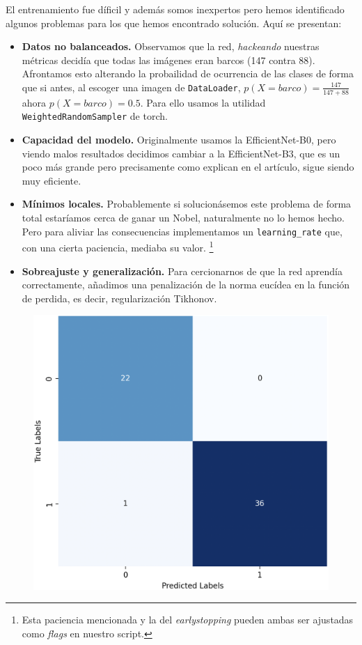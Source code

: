 \documentclass{article}
\begin{document}
El entrenamiento fue díficil y además somos inexpertos pero hemos identificado algunos problemas para los que hemos encontrado solución. Aquí se presentan:
\begin{itemize}
	\item \textbf{Datos no balanceados.} Observamos que la red, \emph{hackeando} nuestras métricas decidía que todas las imágenes eran barcos (147 contra 88). Afrontamos esto alterando la probailidad de ocurrencia de las clases de forma que si antes, al escoger una imagen de \texttt{DataLoader}, $p(X=barco) = \frac{147}{147+88}$ ahora $p(X = barco) = 0.5$. Para ello usamos la utilidad \texttt{WeightedRandomSampler} de torch.
	\item \textbf{Capacidad del modelo.} Originalmente usamos la EfficientNet-B0, pero viendo malos resultados decidimos cambiar a la EfficientNet-B3, que es un poco más grande pero precisamente como explican en el artículo, sigue siendo muy eficiente.
	\item \textbf{Mínimos locales.} Probablemente si solucionásemos este problema de forma total estaríamos cerca de ganar un Nobel, naturalmente no lo hemos hecho. Pero para aliviar las consecuencias implementamos un \texttt{learning\_rate} que, con una cierta paciencia, mediaba su valor. \footnote{Esta paciencia mencionada y la del \emph{earlystopping} pueden ambas ser ajustadas como \emph{flags} en nuestro script.}
	\item \textbf{Sobreajuste y generalización.} Para cercionarnos de que la red aprendía correctamente, añadimos una penalización de la norma eucídea en la función de perdida, es decir, regularización Tikhonov.
\end{itemize}


\begin{figure}
	\includegraphics[width=1\linewidth]{cmEj1} 
	\label{fig:cmEj1}
\end{figure}
\end{document}

